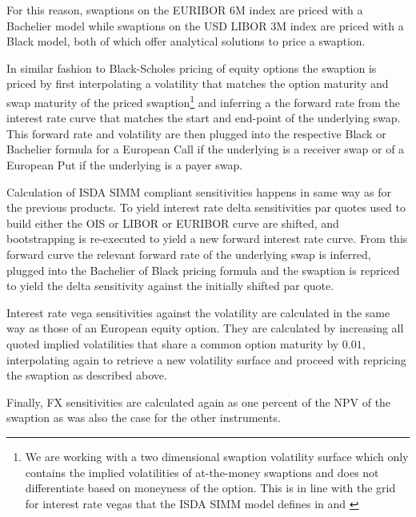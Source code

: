 \documentclass[../Thesis_AHoecherl.tex]{subfiles}
\begin{document}
    For this reason, swaptions on the \gls{EURIBOR} 6M index are priced with a Bachelier model while swaptions on the USD \gls{LIBOR} 3M index are priced with a Black model, both of which offer analytical solutions to price a swaption.

    In similar fashion to Black-Scholes pricing of equity options the swaption is priced by first interpolating a volatility that matches the option maturity and swap maturity of the priced swaption\footnote{We are working with a two dimensional swaption volatility surface which only contains the implied volatilities of at-the-money swaptions and does not differentiate based on moneyness of the option. This is in line with the grid for interest rate vegas that the \gls{ISDA SIMM} model defines in \cite[Section 2.8]{RiskDataStandard} and \cite[Point 10]{SIMM}} and inferring a the forward rate from the interest rate curve that matches the start and end-point of the underlying swap.
    This forward rate and volatility are then plugged into the respective Black or Bachelier formula for a European Call if the underlying is a receiver swap or of a European Put if the underlying is a payer swap.

    Calculation of \gls{ISDA SIMM} compliant sensitivities happens in same way as for the previous products.
    To yield interest rate delta sensitivities par quotes used to build either the \gls{OIS} or LIBOR or \gls{EURIBOR} curve are shifted, and bootstrapping is re-executed to yield a new forward interest rate curve.
    From this forward curve the relevant forward rate of the underlying swap is inferred, plugged into the Bachelier of Black pricing formula and the swaption is repriced to yield the delta sensitivity against the initially shifted par quote.

    Interest rate vega sensitivities against the volatility are calculated in the same way as those of an European equity option.
    They are calculated by increasing all quoted implied volatilities that share a common option maturity by $0.01$, interpolating again to retrieve a new volatility surface and proceed with repricing the swaption as described above.

    Finally, FX sensitivities are calculated again as one percent of the \gls{NPV} of the swaption as was also the case for the other instruments.
\end{document}
